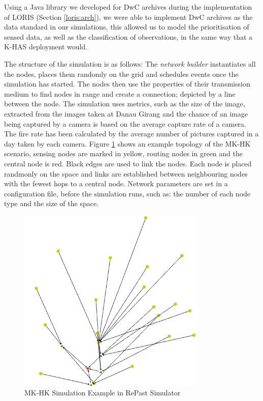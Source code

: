 Using a Java library we developed for DwC archives during the implementation of LORIS (Section \ref{loris:arch}), we were able to implement DwC archives as the data standard in our simulations, this allowed us to model the prioritisation of sensed data, as well as the classification of observations, in the same way that a K-HAS deployment would.

The structure of the simulation is as follows: The \textit{network builder} instantiates all the nodes, places them randomly on the grid and schedules events once the simulation has started. The nodes then use the properties of their transmission medium to find nodes in range and create a connection; depicted by a line between the node. The simulation uses metrics, such as the size of the image, extracted from the images taken at Danau Girang and the chance of an image being captured by a camera is based on the average capture rate of a camera. The fire rate has been calculated by the average number of pictures captured in a day taken by each camera. Figure \ref{fig:sim} shows an example topology of the MK-HK scenario, sensing nodes are marked in yellow, routing nodes in green and the central node is red. Black edges are used to link the nodes. Each node is placed randmonly on the space and links are established between neighbouring nodes with the fewest hops to a central node. Network parameters are set in a configuration file, before the simulation runs, such as: the number of each node type and the size of the space.


	\begin{figure}[h]
	\centering
	\includegraphics[width=0.8\textwidth]{Chap7/figures/khas_sim}
	\caption{MK-HK Simulation Example in RePast Simulator}
	\label{fig:sim}
	\end{figure}


